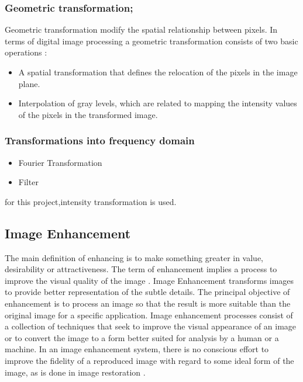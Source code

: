 \subsubsection{Geometric transformation;}
Geometric transformation modify the spatial relationship between pixels. In terms of digital image processing a geometric transformation consists of two basic operations \cite{dip4}:				

\begin{itemize}
	\item A spatial transformation that defines the relocation of the pixels in the image plane.
	\item Interpolation of gray levels, which are related to mapping the intensity values of the pixels in the transformed image.
\end{itemize}

\subsubsection{Transformations into frequency domain}
\begin{itemize}
	\item Fourier Transformation
	\item Filter
\end{itemize}
for this project,intensity transformation is used.


\subsection{Image Enhancement}
The main definition of enhancing is to make something greater in value, desirability or attractiveness. The term of enhancement implies a process to improve the visual quality of the image \cite{ie1}. Image Enhancement transforms images to provide better representation of the subtle details. The principal objective of enhancement is to process an image so that the result is more suitable than the original image for a specific application\cite{lime}. Image enhancement processes consist of a collection of techniques that seek to improve the visual appearance of an image or to convert the image to a form better suited for analysis by a human or a machine. In an image enhancement system, there is no conscious effort to improve the fidelity of a reproduced image with regard to some ideal form of the image, as is done in image restoration \cite{lime}.

